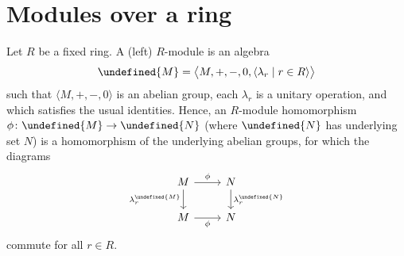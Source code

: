 \documentclass[article, a4paper, 11pt, oneside]{memoir}
\let\mathfrak\undefined
\numberwithin{equation}{chapter}
\theoremstyle{nonumberplain}
\begin{document}
\section{Modules over a ring}

\begin{remarkbreak}
    Let $R$ be a fixed ring. A (left) $R$-module is an algebra
    \begin{equation*}
        \mathfrak{M} = \bigl\langle M, +, -, 0, \langle \lambda_r \mid r \in R \rangle \bigr\rangle
    \end{equation*}
    such that $\langle M, +, -, 0 \rangle$ is an abelian group, each $\lambda_r$ is a unitary operation, and which satisfies the usual identities. Hence, an $R$-module homomorphism $\phi \colon \mathfrak{M} \to \mathfrak{N}$ (where $\mathfrak{N}$ has underlying set $N$) is a homomorphism of the underlying abelian groups, for which the diagrams
    \begin{equation*}
        \begin{tikzcd}
            M
                \ar[r, "\phi"]
                \ar[d, "\lambda_r^{\mathfrak{M}}", swap]
            & N
                \ar[d, "\lambda_r^{\mathfrak{N}}"]
            \\
            M
                \ar[r, "\phi", swap]
            & N
        \end{tikzcd}
    \end{equation*}
    commute for all $r \in R$.
\end{remarkbreak}
\end{document}

